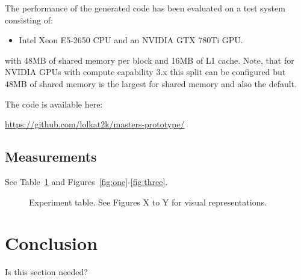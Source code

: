 The performance of the generated code has been evaluated on
a test system consisting of:
%
\begin{itemize}
  \item Intel Xeon E5-2650 CPU and an NVIDIA GTX 780Ti GPU.
\end{itemize}
%
with 48MB of shared memory per block and 16MB of L1
cache. Note, that for NVIDIA GPUs with compute capability
3.x this split can be configured but 48MB of shared memory
is the largest for shared memory and also the default.


The code is available here: \\
\centerline{\url{https://github.com/lolkat2k/masters-prototype/}}


\subsection{Measurements}

See Table~\ref{tab:experiment} and
Figures~\ref{fig:one}-\ref{fig:three}.
%
\begin{figure}
  \caption{Experiment table. See Figures X to Y for visual
    representations.}
  \label{tab:experiment}
\end{figure}
%

\section{Conclusion}

Is this section needed?
